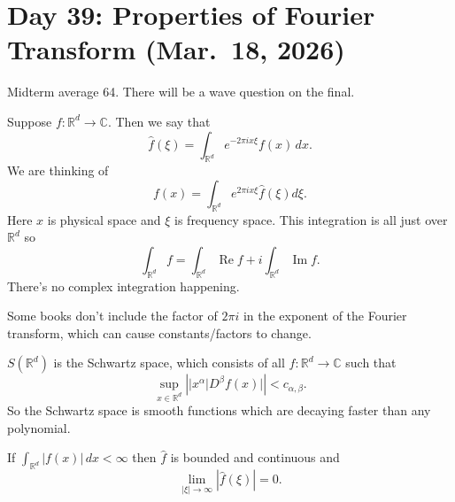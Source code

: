 \section{Day 39: Properties of Fourier Transform (Mar.\ 18, 2026)}
Midterm average 64. There will be a wave question on the final. 

Suppose \( f \colon \mathbb{R}^{d} \to \mathbb{C} \). Then we say that
\[ \hat f(\xi) = \int_{\mathbb{R}^{d}} e^{-2 \pi i x \xi}f(x) \, dx. \]
We are thinking of
\[ f(x) = \int_{\mathbb{R}^{d}} e^{2 \pi i x \xi} \hat f( \xi) d \xi. \]
Here \( x \) is physical space and \( \xi \) is frequency space. This integration is all just over \( \mathbb{R}^{d} \) so
\[ \int_{\mathbb{R}^{d}} f = \int_{\mathbb{R}^{d}} \operatorname{Re} f + i \int_{\mathbb{R}^{d}} \operatorname{Im} f.  \]
There's no complex integration happening.

\begin{remark}
	Some books don't include the factor of \( 2 \pi i \) in the exponent of the Fourier transform, which can cause constants/factors to change.
\end{remark}

\begin{definition}
	\( S(\mathbb{R}^{d}) \) is the Schwartz space, which consists of all \( f \colon \mathbb{R}^{d} \to \mathbb{C} \) such that
	\[ \sup_{x \in \mathbb{R}^{d}} \left| |x^{\alpha}| D^{\beta} f(x)| \right| < c_{\alpha, \beta}. \]
	So the Schwartz space is smooth functions which are decaying faster than any polynomial.
	
\end{definition}

\begin{lemma}
	If \( \int_{\mathbb{R}^{d}} |f(x)| \, dx < \infty  \) then \( \hat f \) is bounded and continuous and
	\[
		\lim_{|\xi| \to \infty} | \hat f( \xi)| = 0.
	\]
\end{lemma}

